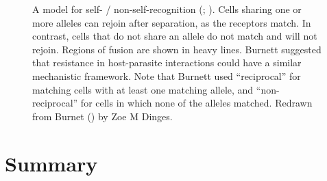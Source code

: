 \documentclass[
  letterpaper,
]{book}
\begin{document}
\begin{figure}


\caption[A model for self- / non-self-recognition]{\label{fig-4.6}A
model for self- / non-self-recognition
(; ). Cells sharing one or more alleles can rejoin after separation,
as the receptors match. In contrast, cells that do not share an allele
do not match and will not rejoin. Regions of fusion are shown in heavy
lines. Burnett suggested that resistance in host-parasite interactions
could have a similar mechanistic framework. Note that Burnett used
``reciprocal'' for matching cells with at least one matching allele, and
``non-reciprocal'' for cells in which none of the alleles matched.
Redrawn from Burnet () by Zoe M Dinges.}

\end{figure}%

\section{Summary}\label{summary-3}
\end{document}
